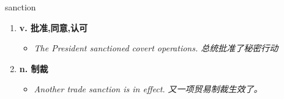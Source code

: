 
\begin{frame}
{\huge sanction}
\begin{center}
\begin{enumerate}\Large
  \item \textbf{v. 批准,同意,认可}
  \begin{itemize}
    \item \em{\Large{The President sanctioned covert operations. 总统批准了秘密行动}}
  \end{itemize}
  \item \textbf{n. 制裁}
  \begin{itemize}
    \item \em{\Large{Another trade sanction is in effect. 又一项贸易制裁生效了。}}
  \end{itemize}
\end{enumerate}
\end{center}
\end{frame}
